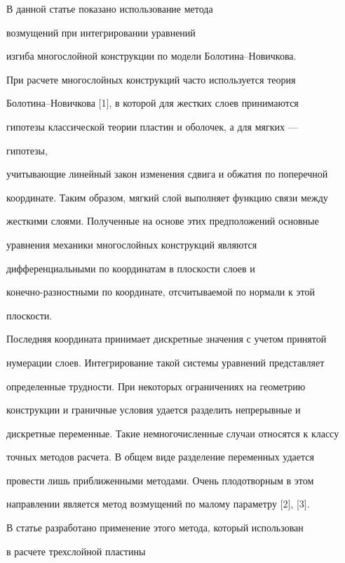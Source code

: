  


 


В данной статье показано использование метода 


возмущений при интегрировании уравнений 


изгиба многослойной конструкции по модели Болотина--Новичкова. 


 


При расчете многослойных конструкций часто используется теория 


Болотина--Новичкова [1], в которой для жестких слоев принимаются 


гипотезы классической теории пластин и оболочек, а для мягких --- 


гипотезы, 


учитывающие линейный закон изменения сдвига и обжатия по поперечной 


координате. Таким образом, мягкий слой выполняет функцию связи между 


жесткими слоями. Полученные на основе этих предположений основные 


уравнения механики многослойных конструкций являются 


дифференциальными по координатам в плоскости слоев и 


конечно-разностными по координате, отсчитываемой по нормали к этой 


плоскости. 


Последняя координата принимает дискретные значения с учетом принятой 


нумерации слоев. Интегрирование такой системы уравнений представляет 


определенные трудности. При некоторых ограничениях на геометрию 


конструкции и граничные условия удается разделить непрерывные и 


дискретные переменные. Такие немногочисленные случаи относятся к классу 


точных методов расчета. В общем виде разделение переменных удается 


провести лишь приближенными методами. Очень плодотворным в этом 


направлении является метод возмущений по малому параметру [2], [3]. 


В статье разработано применение этого метода, который использован


в расчете трехслойной пластины 


